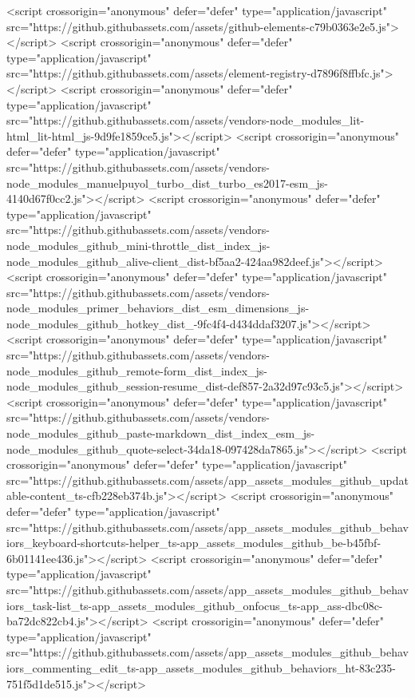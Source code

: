 <script crossorigin="anonymous" defer="defer" type="application/javascript" src="https://github.githubassets.com/assets/github-elements-c79b0363e2e5.js"></script>
<script crossorigin="anonymous" defer="defer" type="application/javascript" src="https://github.githubassets.com/assets/element-registry-d7896f8ffbfc.js"></script>
<script crossorigin="anonymous" defer="defer" type="application/javascript" src="https://github.githubassets.com/assets/vendors-node_modules_lit-html_lit-html_js-9d9fe1859ce5.js"></script>
<script crossorigin="anonymous" defer="defer" type="application/javascript" src="https://github.githubassets.com/assets/vendors-node_modules_manuelpuyol_turbo_dist_turbo_es2017-esm_js-4140d67f0cc2.js"></script>
<script crossorigin="anonymous" defer="defer" type="application/javascript" src="https://github.githubassets.com/assets/vendors-node_modules_github_mini-throttle_dist_index_js-node_modules_github_alive-client_dist-bf5aa2-424aa982deef.js"></script>
<script crossorigin="anonymous" defer="defer" type="application/javascript" src="https://github.githubassets.com/assets/vendors-node_modules_primer_behaviors_dist_esm_dimensions_js-node_modules_github_hotkey_dist_-9fc4f4-d434ddaf3207.js"></script>
<script crossorigin="anonymous" defer="defer" type="application/javascript" src="https://github.githubassets.com/assets/vendors-node_modules_github_remote-form_dist_index_js-node_modules_github_session-resume_dist-def857-2a32d97c93c5.js"></script>
<script crossorigin="anonymous" defer="defer" type="application/javascript" src="https://github.githubassets.com/assets/vendors-node_modules_github_paste-markdown_dist_index_esm_js-node_modules_github_quote-select-34da18-097428da7865.js"></script>
<script crossorigin="anonymous" defer="defer" type="application/javascript" src="https://github.githubassets.com/assets/app_assets_modules_github_updatable-content_ts-cfb228eb374b.js"></script>
<script crossorigin="anonymous" defer="defer" type="application/javascript" src="https://github.githubassets.com/assets/app_assets_modules_github_behaviors_keyboard-shortcuts-helper_ts-app_assets_modules_github_be-b45fbf-6b01141ee436.js"></script>
<script crossorigin="anonymous" defer="defer" type="application/javascript" src="https://github.githubassets.com/assets/app_assets_modules_github_behaviors_task-list_ts-app_assets_modules_github_onfocus_ts-app_ass-dbc08c-ba72dc822cb4.js"></script>
<script crossorigin="anonymous" defer="defer" type="application/javascript" src="https://github.githubassets.com/assets/app_assets_modules_github_behaviors_commenting_edit_ts-app_assets_modules_github_behaviors_ht-83c235-751f5d1de515.js"></script>
